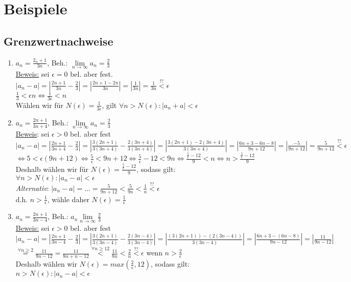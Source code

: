 \documentclass[a4paper,11pt]{article}
\begin{document}
\section{Beispiele}
\subsection{Grenzwertnachweise}
\begin{enumerate}[label={\alph*)}]
	\item $a_n=\frac{2_n+1}{3n}$, Beh.: $\underset{n\to\infty}{\lim}a_n=\frac{2}{3}$\\
		\underline{Beweis:} sei $\epsilon=0$ bel. aber fest.\\
		$|a_n-a|=|\frac{2n+1}{3n}-\frac{2}{3}|=|\frac{2n+1-2n}{3n}|=|\frac{1}{3n}|=\frac{1}{3n}\stackrel{!?}{<}\epsilon$\\
		$\frac{1}{3}<\epsilon n\Leftrightarrow \frac{1}{3\epsilon}<n$\\
		Wählen wir für $N(\epsilon)=\frac{1}{3\epsilon}$, gilt $\forall n>N(\epsilon):|a_n+a|<\epsilon$
	\item $a_n=\frac{2n+1}{3n+4}$, Beh.: $\underset{n\to\infty}{\lim}a_n=\frac{2}{3}$\\
		\underline{Beweis}: sei $\epsilon>0$ bel. aber fest\\
		$|a_n-a|=|\frac{2n+1}{3n+4}-\frac{2}{3}|=|\frac{3(2n+1)}{3(3n+4)}-\frac{2(3n+4)}{3(3n+4)}|=|\frac{3(2n+1)-2(3n+4)}{3(3n+4)}|=|\frac{6n+3-6n-8}{9n+12}|=|\frac{-5}{9n+12}|=\frac{5}{9n+12}\overset{!?}{<}\epsilon$\\
		$\Leftrightarrow 5<\epsilon(9n+12) \Leftrightarrow\frac{5}{\epsilon}<9n+12\Leftrightarrow\frac{5}{\epsilon}-12<9n\Leftrightarrow\frac{\frac{5}{\epsilon}-12}{9}<n\Leftrightarrow n>\frac{\frac{5}{\epsilon}-12}{9}$\\
		Deshalb wählen wir für $N(\epsilon)=\frac{\frac{5}{\epsilon}-12}{9}$, sodass gilt:\\
		$\forall n>N(\epsilon):|a_n-a|<\epsilon$\\
		\emph{Alternativ}: $|a_n-a|=...=\frac{5}{9n+12}<\frac{5}{9n}<\frac{1}{n}\overset{!?}{<}\epsilon$\\
		d.h. $n>\frac{1}{\epsilon}$, wähle daher $N(\epsilon)=\frac{1}{\epsilon}$
	\item $a_n=\frac{2n+1}{3n-4}$, Beh.: $a_n\underset{n\to\infty}{\lim}\frac{2}{3}$\\
		\underline{Beweis:} sei $\epsilon>0$ bel. aber fest\\
		$|a_n-a|=|\frac{2n+1}{3n-4}-\frac{2}{3}|=|\frac{3(2n+1)}{3(3n-4)}-\frac{2(3n-4)}{3(3n-4)}|=|\frac{(3(2n+1))-(2(3n-4))}{3(3n-4)}|=|\frac{6n+3-(6n-8)}{9n-12}|=|\frac{11}{9n-12}|$\\
		$\overset{\forall n\geq2}{=}\frac{11}{9n-12}=\frac{11}{8n+n-12}\overset{\forall n\geq12}{<}\frac{11}{8n}<\frac{2}{n}\overset{!?}{<}\epsilon$ wenn $n>\frac{2}{\epsilon}$\\
		Deshalb wählen wir $N(\epsilon)=max(\frac{2}{\epsilon},12)$, sodass gilt:\\
		$n>N(\epsilon):|a_n-a|<\epsilon$
	\end{enumerate}
\end{document}
